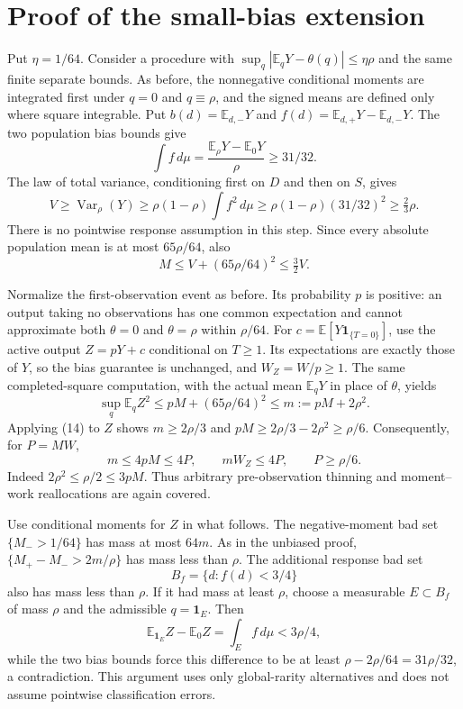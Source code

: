 \documentclass[11pt]{article}
\newcommand{\E}{\mathbb E}
\newcommand{\Var}{\operatorname{Var}}
\newcommand{\ind}{\mathbf1}
\begin{document}
\section{Proof of the small-bias extension}
Put $\eta=1/64$. Consider a procedure with
$\sup_q|\E_qY-\theta(q)|\le\eta\rho$ and the same finite separate bounds.
As before, the nonnegative conditional moments are integrated first under
$q=0$ and $q\equiv\rho$, and the signed means are defined only where square
integrable. Put $b(d)=\E_{d,-}Y$ and
$f(d)=\E_{d,+}Y-\E_{d,-}Y$. The two population bias bounds give
\[
 \int f\,d\mu=\frac{\E_\rho Y-\E_0Y}{\rho}\ge31/32.
\]
The law of total variance, conditioning first on $D$ and then on $S$, gives
\[
 V\ge\Var_\rho(Y)
 \ge\rho(1-\rho)\int f^2\,d\mu
 \ge\rho(1-\rho)(31/32)^2\ge\tfrac23\rho.                \tag{14}
\]
There is no pointwise response assumption in this step. Since every absolute
population mean is at most $65\rho/64$, also
\[
 M\le V+(65\rho/64)^2\le\tfrac32 V.                     \tag{15}
\]

Normalize the first-observation event as before. Its probability $p$ is
positive: an output taking no observations has one common expectation and
cannot approximate both $\theta=0$ and $\theta=\rho$ within $\rho/64$.
For $c=\E[Y\ind_{\{T=0\}}]$, use the active output $Z=pY+c$ conditional on
$T\ge1$. Its expectations are exactly those of $Y$, so the bias guarantee is
unchanged, and $W_Z=W/p\ge1$. The same completed-square computation, with
the actual mean $\E_qY$ in place of $\theta$, yields
\[
 \sup_q\E_qZ^2\le pM+(65\rho/64)^2\le m:=pM+2\rho^2.
\]
Applying (14) to $Z$ shows
$m\ge2\rho/3$ and $pM\ge2\rho/3-2\rho^2\ge\rho/6$.
Consequently, for $P=MW$,
\[
 m\le4pM\le4P,\qquad mW_Z\le4P,\qquad P\ge\rho/6.       \tag{16}
\]
Indeed $2\rho^2\le\rho/2\le3pM$. Thus arbitrary pre-observation thinning
and moment--work reallocations are again covered.

Use conditional moments for $Z$ in what follows. The negative-moment bad set
$\{M_->1/64\}$ has mass at most $64m$. As in the unbiased proof,
$\{M_+-M_->2m/\rho\}$ has mass less than $\rho$.
The additional response bad set
\[
 B_f=\{d:f(d)<3/4\}
\]
also has mass less than $\rho$. If it had mass at least $\rho$, choose a
measurable $E\subset B_f$ of mass $\rho$ and the admissible $q=\ind_E$.
Then
\[
 \E_{\ind_E}Z-\E_0Z=\int_E f\,d\mu<3\rho/4,
\]
while the two bias bounds force this difference to be at least
$\rho-2\rho/64=31\rho/32$, a contradiction. This argument uses only
global-rarity alternatives and does not assume pointwise classification errors.
\end{document}
